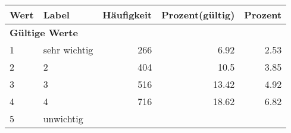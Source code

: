      \begin{longtable}{lXrrr}
     \toprule
     \textbf{Wert} & \textbf{Label} & \textbf{Häufigkeit} & \textbf{Prozent(gültig)} & \textbf{Prozent} \\
     \endhead
     \midrule
     \multicolumn{5}{l}{\textbf{Gültige Werte}}\\

     1 &
     \multicolumn{1}{X}{ sehr wichtig   } &


       \num{266} &
       \num[round-mode=places,round-precision=2]{6,92} &
         \num[round-mode=places,round-precision=2]{2,53} \\

     2 &
     \multicolumn{1}{X}{ 2   } &


       \num{404} &
       \num[round-mode=places,round-precision=2]{10,5} &
         \num[round-mode=places,round-precision=2]{3,85} \\

     3 &
     \multicolumn{1}{X}{ 3   } &


       \num{516} &
       \num[round-mode=places,round-precision=2]{13,42} &
         \num[round-mode=places,round-precision=2]{4,92} \\

     4 &
     \multicolumn{1}{X}{ 4   } &


       \num{716} &
       \num[round-mode=places,round-precision=2]{18,62} &
         \num[round-mode=places,round-precision=2]{6,82} \\

     5 &
     \multicolumn{1}{X}{ unwichtig   } &



\end{longtable}
